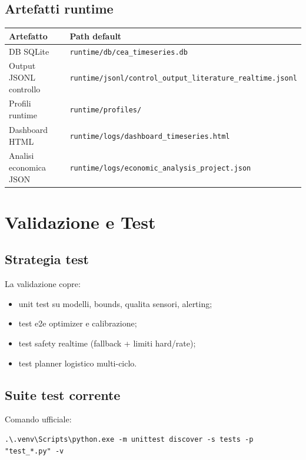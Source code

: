 ﻿\documentclass[11pt,a4paper]{report}
\begin{document}
\section{Artefatti runtime}
\begin{longtable}{@{}p{4.2cm}p{7.8cm}@{}}
\toprule
Artefatto & Path default \\ \midrule
DB SQLite & \texttt{runtime/db/cea\_timeseries.db} \\
Output JSONL controllo & \texttt{runtime/jsonl/control\_output\_literature\_realtime.jsonl} \\
Profili runtime & \texttt{runtime/profiles/} \\
Dashboard HTML & \texttt{runtime/logs/dashboard\_timeseries.html} \\
Analisi economica JSON & \texttt{runtime/logs/economic\_analysis\_project.json} \\
\bottomrule
\end{longtable}

\newpage
\chapter{Validazione e Test}

\section{Strategia test}
La validazione copre:
\begin{itemize}
  \item unit test su modelli, bounds, qualita sensori, alerting;
  \item test e2e optimizer e calibrazione;
  \item test safety realtime (fallback + limiti hard/rate);
  \item test planner logistico multi-ciclo.
\end{itemize}

\section{Suite test corrente}
Comando ufficiale:
\begin{lstlisting}
.\.venv\Scripts\python.exe -m unittest discover -s tests -p "test_*.py" -v
\end{lstlisting}
\end{document}
